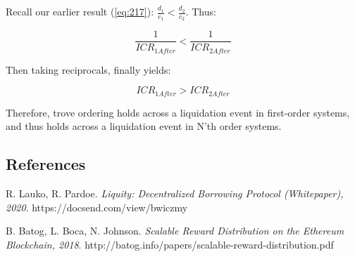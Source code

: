 \documentclass[reqno]{article}
\begin{document}
\bigskip
Recall our earlier result (\ref{eq:217}): $\frac{d_1}{c_1}<\frac{d_2}{c_2}$. Thus:

\begin{equation} 
    \frac{1}{ICR_{1After}}<\frac{1}{ICR_{2After}}
\end{equation}

\bigskip
Then taking reciprocals, finally yields:

\begin{equation} 
    ICR_{1After}>ICR_{2After}
\end{equation}

\bigskip
Therefore, trove ordering holds across a liquidation event in first-order systems, and thus holds across a liquidation event in N’th order systems.

\bigskip
\subsection*{References}

\begin{thebibliography}{9}

R. Lauko, R. Pardoe. 
\textit{Liquity: Decentralized Borrowing Protocol (Whitepaper), 2020}. 
https://docsend.com/view/bwiczmy

B. Batog, L. Boca, N. Johnson.
\textit{Scalable Reward Distribution on the Ethereum Blockchain, 2018}. 
http://batog.info/papers/scalable-reward-distribution.pdf


\end{thebibliography}
\end{document}
